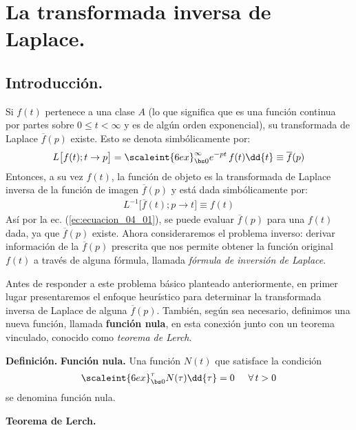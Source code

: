 \section{La transformada inversa de Laplace.}

\subsection{Introducción.}

Si $f (t)$ pertenece a una clase $A$ (lo que significa que es una función continua por partes sobre $0 \leq t < \infty$ y es de algún orden exponencial), su transformada de Laplace $\overline{f} (p)$ existe. Esto se denota simbólicamente por:
\begin{align}
L \big[  f (t); t \to p  \big] = \scaleint{6ex}_{\bs 0}^{\infty} e^{-p t} \, f (t) \dd{t} \equiv \overline{f} (p)
\label{ec:ecuacion_04_01}
\end{align}
Entonces, a su vez $f (t)$, la función de objeto es la transformada de Laplace inversa de la función de imagen $\overline{f} (p)$ y está dada simbólicamente por:
\begin{align}
L^{-1} \big[  \overline{f} (t); p \to t  \big] \equiv f (t)
\label{ec:ecuacion_04_02}
\end{align}
Así por la ec. (\ref{ec:ecuacion_04_01}), se puede evaluar $\overline{f} (p)$ para una $f (t)$ dada, ya que $\overline{f} (p)$ existe. Ahora consideraremos el problema inverso: derivar información de la $\overline{f} (p)$ prescrita que nos permite obtener la función original $f (t)$ a través de alguna fórmula, llamada \emph{fórmula de inversión de Laplace}.
\par
Antes de responder a este problema básico planteado anteriormente, en primer lugar presentaremos el enfoque heurístico para determinar la transformada inversa de Laplace de alguna $\overline{f} (p)$. También, según sea necesario, definimos una nueva función, llamada \textbf{función nula}, en esta conexión junto con un teorema vinculado, conocido como \emph{teorema de Lerch}.
\par
\noindent \textbf{Definición.} \textbf{Función nula.} Una función $N (t)$ que satisface la condición
\begin{align*}
\scaleint{6ex}_{\bs 0}^{\tau} N (\tau) \dd{\tau} = 0 \hspace{0.5cm} \forall \, t > 0
\end{align*}
se denomina función nula.
\par
\noindent \textbf{Teorema de Lerch.}

